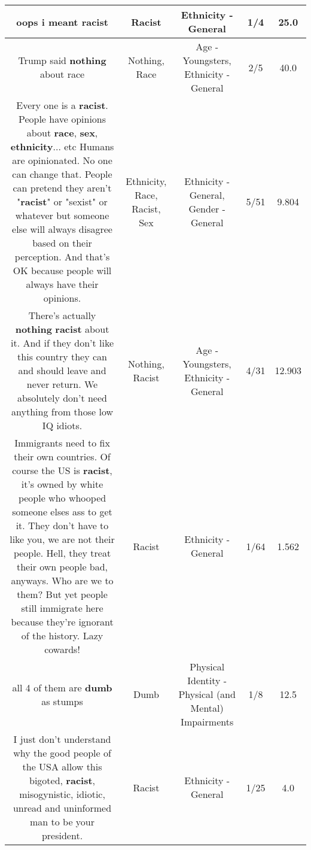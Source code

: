 \documentclass[11pt]{article}
\newlength\mylength
\begin{document}
\begin{center}
\begin{longtable}{|C{.65\mylength}|C{.30\mylength}|C{.12\mylength}|C{.12\mylength}|C{.12\mylength}|}
  \small oops i meant racist\normalsize   & Racist & Ethnicity - General & 1/4 & 25.0 \\  \hline
  \small Trump said \textbf{nothing} about race\normalsize   & Nothing, Race & Age - Youngsters, Ethnicity - General & 2/5 & 40.0 \\  \hline
  \small Every one is a \textbf{racist}. People have opinions about \textbf{race}, \textbf{sex}, \textbf{ethnicity}... etc Humans are opinionated. No one can change that. People can pretend they aren't "\textbf{racist}" or "sexist" or whatever but someone else will always disagree based on their perception. And that's OK because people will always have their opinions.\normalsize   & Ethnicity, Race, Racist, Sex & Ethnicity - General, Gender - General & 5/51 & 9.804 \\  \hline
  \small There's actually \textbf{nothing} \textbf{racist} about it. And if they don't like this country they can and should leave and never return. We absolutely don't need anything from those low IQ idiots.\normalsize   & Nothing, Racist & Age - Youngsters, Ethnicity - General & 4/31 & 12.903 \\  \hline
  \small Immigrants need to fix their own countries. Of course the US is \textbf{racist}, it's owned by white people who whooped someone elses ass to get it. They don't have to like you, we are not their people. Hell, they treat their own people bad, anyways. Who are we to them? But yet people still immigrate here because they're ignorant of the history. Lazy cowards!\normalsize   & Racist & Ethnicity - General & 1/64 & 1.562 \\  \hline
  \small all 4 of them are \textbf{dumb} as stumps\normalsize   & Dumb & Physical Identity - Physical (and Mental) Impairments & 1/8 & 12.5 \\  \hline
  \small I just don't understand why the good people of the USA allow this bigoted, \textbf{racist}, misogynistic, idiotic, unread and uninformed man to be your president.\normalsize   & Racist & Ethnicity - General & 1/25 & 4.0 \\  \hline

\end{longtable}
\end{center}
\end{document}
